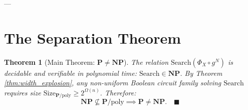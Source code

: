 \documentclass[11pt,a4paper]{article}
\theoremstyle{plain}
\newtheorem{theorem}{Theorem}[section]
\theoremstyle{definition}
\theoremstyle{remark}
\newcommand{\Size}{\mathrm{Size}}
\newcommand{\Search}{\mathrm{Search}}
\begin{document}
---

\section{The Separation Theorem}

\begin{theorem}[Main Theorem: $\mathbf{P} \neq \mathbf{NP}$]\label{thm:main_separation}
The relation $\Search(\Phi_X \circ g^N)$ is decidable and verifiable in polynomial time: $\Search \in \mathbf{NP}$. 
By Theorem \ref{thm:width_explosion}, any non-uniform Boolean circuit family solving $\Search$ requires size $\Size_{\mathbf{P}/\mathrm{poly}} \ge 2^{\Omega(n)}$. 
Therefore:
\[
\mathbf{NP} \not\subseteq \mathbf{P}/\mathrm{poly} \implies \mathbf{P} \neq \mathbf{NP}. \quad \blacksquare
\]
\end{theorem}
\end{document}
